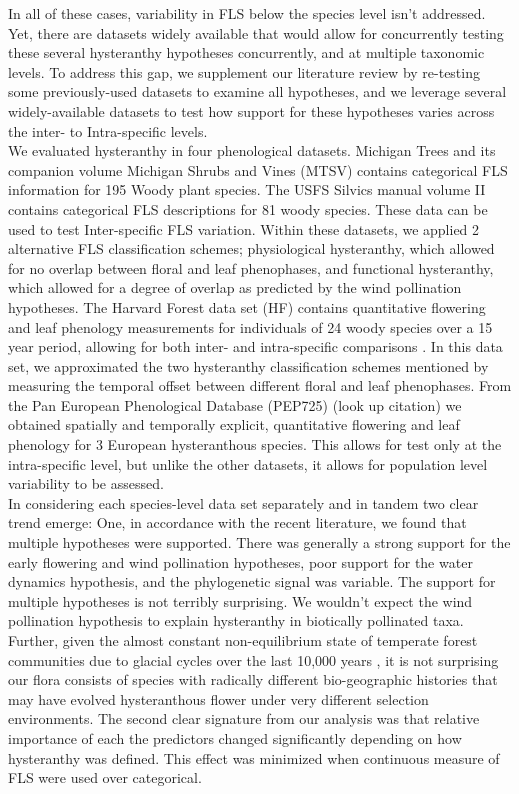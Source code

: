 \documentclass[12pt]{article}\usepackage[]{graphicx}\usepackage[]{color}
\begin{document}
\indent In all of these cases, variability in FLS below the species level isn't addressed. Yet, there are datasets widely available that would allow for concurrently testing these several hysteranthy hypotheses concurrently, and at multiple taxonomic levels. To address this gap, we supplement our literature review by re-testing some previously-used datasets to examine all hypotheses, and we leverage several widely-available datasets to test how support for these hypotheses varies across the inter- to Intra-specific levels.\\ 
\indent We evaluated hysteranthy in four phenological datasets. Michigan Trees and its companion volume Michigan Shrubs and Vines \citep{Barnes2004,Barnes2016} (MTSV) contains categorical FLS information for 195 Woody plant species. The USFS Silvics manual volume II \citep{Burns1990} contains categorical FLS descriptions for 81 woody species. These data can be used to test Inter-specific FLS variation. Within these datasets, we applied 2 alternative FLS classification schemes; physiological hysteranthy, which allowed for no overlap between floral and leaf phenophases, and functional hysteranthy, which allowed for a degree of overlap as predicted by the wind pollination hypotheses. The Harvard Forest data set (HF) contains quantitative flowering and leaf phenology measurements for individuals of 24 woody species over a 15 year period, allowing for both inter- and intra-specific comparisons \citep{OKeefe2015}. In this data set, we approximated the two hysteranthy classification schemes mentioned by measuring the temporal offset between different floral and leaf phenophases. From the Pan European Phenological Database (PEP725) (look up citation) we obtained spatially and temporally explicit, quantitative flowering and leaf phenology for 3 European hysteranthous species. This allows for test only at the intra-specific level, but unlike the other datasets, it allows for population level variability to be assessed.\\
\indent In considering each species-level data set separately and in tandem two clear trend emerge: One, in accordance with the recent literature, we found that multiple hypotheses were supported. There was generally a strong support for the early flowering and wind pollination hypotheses, poor support for the water dynamics hypothesis, and the phylogenetic signal was variable. The support for multiple hypotheses is not terribly surprising. We wouldn't expect the wind pollination hypothesis to explain hysteranthy in biotically pollinated taxa. Further, given the almost constant non-equilibrium state of temperate forest communities due to glacial cycles over the last 10,000 years \citep{Spurr1980}, it is not surprising our flora consists of species with radically different bio-geographic histories that may have evolved hysteranthous flower under very different selection environments.  The second clear signature from our analysis was that relative importance of each the predictors changed significantly depending on how hysteranthy was defined. This effect was minimized when continuous measure of FLS were used over categorical.\\
\end{document}
